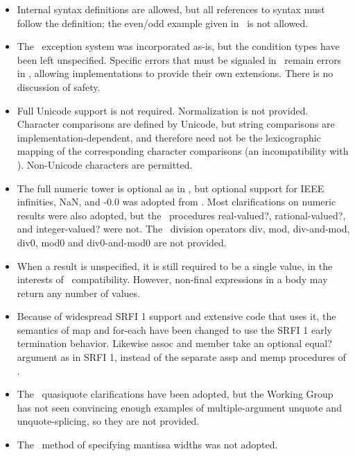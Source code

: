 \begin{itemize}
\item Internal syntax definitions are allowed, but all references to syntax
must follow the definition; the {\cf even}/{\cf odd} example given in
\rsixrs\ is not allowed.

\item The \rsixrs\ exception system was incorporated as-is, but the condition
types have been left unspecified.  Specific errors that must be signaled
in \rsixrs\ remain errors in \rsevenrs, allowing implementations to provide
their own extensions.  There is no discussion of safety.

\item Full Unicode support is not required.
Normalization is not provided.
Character comparisons are
defined by Unicode, but string comparisons are implementation-dependent,
and therefore need not be the lexicographic mapping of the corresponding
character comparisons (an incompatibility with \rfivers). Non-Unicode
characters are permitted.

\item The full numeric tower is optional as in \rfivers, but optional support for IEEE
infinities, NaN, and {\mbox -0.0} was adopted from \rsixrs. Most clarifications on
numeric results were also adopted, but the \rsixrs\ procedures {\cf real-valued?},
{\cf rational-valued?}, and {\cf integer-valued}? were not. 
The \rsixrs\ division operators {\cf div}, {\cf mod}, {\cf div-and-mod}, {\cf
div0}, {\cf mod0} and {\cf div0-and-mod0} are not provided.

\item When a result is unspecified, it is still required to be a single value,
in the interests of \rfivers\ compatibility. However, non-final expressions
in a body may return any number of values.

\item Because of widespread SRFI 1 support and extensive code
that uses it, the semantics of {\cf map} and {\cf for-each} have been changed to use
the SRFI 1 early termination behavior. Likewise
{\cf assoc} and {\cf member} take an optional {\cf equal?} argument as in SRFI 1,
instead of the separate {\cf assp} and {\cf memp} procedures of \rsixrs.

\item The \rsixrs~{\cf quasiquote} clarifications have been adopted, but the Working Group has not seen
convincing enough examples of multiple-argument {\cf unquote} and
{\cf unquote-splicing}, so they are not provided.

\item The \rsixrs~method of specifying mantissa widths was not adopted.

\end{itemize}

